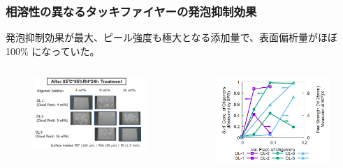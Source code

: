 \documentclass[12pt, dvipdfmx]{beamer}
\begin{document}
	
\begin{frame}\frametitle{相溶性の異なるタッキファイヤーの発泡抑制効果}

\large
発泡抑制効果が最大、ピール強度も極大となる添加量で、表面偏析量がほぼ 100\% になっていた。

\begin{columns}
\begin{column}{6 cm}
	\begin{figure}[htbp]
		\begin{center}
			\includegraphics[width=60mm]{tennka_hapou_BW.png}
		\end{center}
	\end{figure}
\end{column}
\begin{column}{6cm}
	\begin{figure}[htbp]
		\begin{center}
			\hspace{10pt}
			\includegraphics[width=60mm]{Exp_Data_color.png}
		\end{center}
\end{figure}

\end{column}
\end{columns}

\end{frame}
\end{document}
